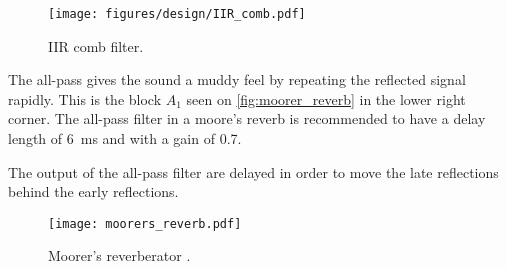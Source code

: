 \begin{figure}[htbp]
	\centering
	\texttt{[image: figures/design/IIR\_comb.pdf]}
	\caption{IIR comb filter.}
	\label{fig:comb_iir}
\end{figure}

The all-pass gives the sound a muddy feel by repeating the reflected signal rapidly. This is the block $A_1$ seen on \autoref{fig:moorer_reverb} in the lower right corner. The all-pass filter in a moore's reverb is recommended to have a delay length of \SI{6}{\milli\second} and with a gain of 0.7.

The output of the all-pass filter are delayed in order to move the late reflections behind the early reflections. 

\begin{figure}[htbp]
	\centering
	\texttt{[image: moorers\_reverb.pdf]}
	\caption{Moorer’s reverberator \citep{DAFX}.}
	\label{fig:moorer_reverb}
\end{figure}
\newpage